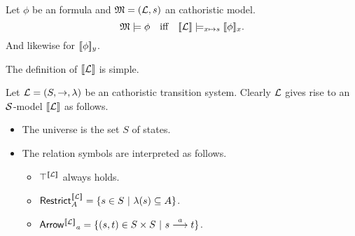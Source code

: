 \begin{theorem}\label{correspondence:theorem:1}
Let $\phi$ be an \cathoristic{} formula and $\frak{M} = (\mathcal{L}, s)$ an cathoristic
model.
\[
   \frak{M} \models \phi \quad  \text{iff} \quad \lbrack\!\lbrack \mathcal{L} \rbrack\!\rbrack \models_{x \mapsto s} \lbrack\!\lbrack \phi \rbrack\!\rbrack_x.
\]
And likewise for $\lbrack\!\lbrack \phi \rbrack\!\rbrack_y$.
\end{theorem}

\NI The definition of $\lbrack\!\lbrack \mathcal{L} \rbrack\!\rbrack$ is simple.

\begin{definition}
Let $\mathcal{L} = (S, \rightarrow, \lambda)$ be an cathoristic transition
system. Clearly $\mathcal{L}$ gives rise to an $\mathcal{S}$-model $\lbrack\!\lbrack \mathcal{L} \rbrack\!\rbrack$ as
follows.
\begin{itemize}

\item The universe is the set $S$ of states.

\item The relation symbols are interpreted as follows.

  \begin{itemize}

    \item $\top^{\lbrack\!\lbrack \mathcal{L} \rbrack\!\rbrack}$ always holds.

    \item $\mathsf{Restrict}_{A}^{\lbrack\!\lbrack \mathcal{L} \rbrack\!\rbrack} = \{ s \in S\ |\ \lambda(s) \subseteq A\}$.

    \item $\mathsf{Arrow^{\lbrack\!\lbrack \mathcal{L} \rbrack\!\rbrack}}_{a} = \{(s, t) \in S \times S\ |\ s \stackrel{a}{\longrightarrow} t\}$.

  \end{itemize}
\end{itemize}
\end{definition}


